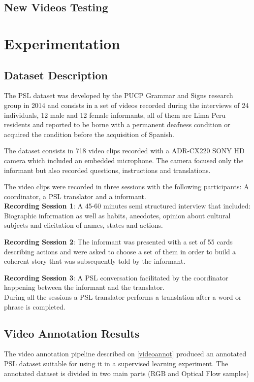 \documentclass[twocolumn,conference]{article}
\begin{document}
\subsection{New Videos Testing}

\section{Experimentation}\label{experimentation}
\subsection{Dataset Description \cite{lsp_dataset}}\label{datasetdesc}
The PSL dataset was developed by the PUCP Grammar and Signs research group in 2014 and consists in a set of videos recorded during the interviews of 24 individuals, 12 male and 12 female informants, all of them are Lima Peru residents and reported to be borne with a permanent deafness condition or acquired the condition before the acquisition of Spanish. 

The dataset consists in 718 video clips recorded with a ADR-CX220 SONY HD camera which included an embedded microphone. The camera focused only the informant but also recorded questions, instructions and translations.

The video clips were recorded in three sessions with the following participants: A coordinator, a PSL \cite{lsp_2015} translator and a informant.\\

\textbf{Recording Session 1}: A 45-60 minutes semi structured interview that included: Biographic information as well as habits, anecdotes, opinion about cultural subjects and elicitation of names, states and actions. 

\textbf{Recording Session 2}: The informant was presented with a set of 55 cards describing actions and were asked to choose a set of them in order to build a coherent story that was subsequently told by the informant.

\textbf{Recording Session 3}: A PSL \cite{lsp_2015} conversation facilitated by the coordinator happening between the informant and the translator.\\

During all the sessions a PSL \cite{lsp_2015} translator performs a translation after a word or phrase is completed.

\subsection{Video Annotation Results}
The video annotation pipeline described on \ref{videoannot} produced an annotated PSL dataset suitable for using it in a supervised learning experiment. The annotated dataset is divided in two main parts (RGB and Optical Flow samples)
\end{document}
